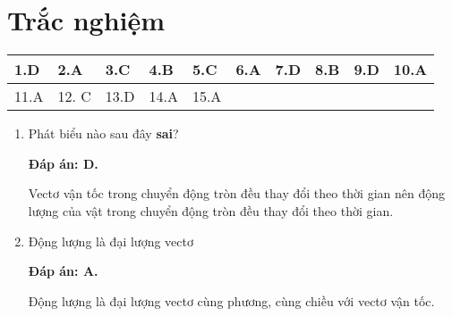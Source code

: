 \let\lesson\undefined
\newcommand{\lesson}{\phantomlesson{Bài 18.}}
\setcounter{section}{2}
\section{Trắc nghiệm}
\ANSMCQ
{	\begin{center}
		\begin{tabular}{|m{2.8em}|m{2.8em}|m{2.8em}|m{2.8em}|m{2.8em}|m{2.8em}|m{2.8em}|m{2.8em}|m{2.8em}|m{2.8em}|}
			\hline
			1.D  & 2.A  & 3.C  & 4.B  & 5.C  & 6.A  & 7.D  & 8.B  & 9.D  & 10.A  \\
			\hline
			11.A  & 12. C  & 13.D  & 14.A  & 15.A  & &   &   &   &   \\
			\hline
		\end{tabular}
	\end{center}
}
\begin{enumerate}[label=\bfseries Câu \arabic*:, leftmargin=1.5cm]
	\item {}
	
	
	{
		Phát biểu nào sau đây \textbf{sai}?
	}
	
	\hideall
	{	
		\textbf{Đáp án: D.}
		
		Vectơ vận tốc trong chuyển động tròn đều thay đổi theo thời gian nên động lượng của vật trong chuyển động tròn đều thay đổi theo thời gian.
	}
	\item {}
	
	
	{
		Động lượng là đại lượng vectơ
	}
	
	\hideall
	{	
		\textbf{Đáp án: A.}
		
		Động lượng là đại lượng vectơ cùng phương, cùng chiều với vectơ vận tốc.
	}
	

\end{enumerate}
